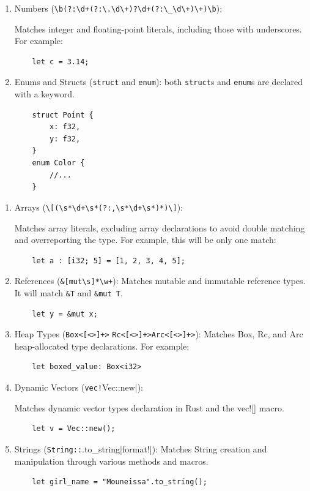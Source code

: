 \documentclass[nomenclature, english, bibtex]{kththesis}
\begin{document}
{\begin{enumerate}
    \item Numbers (\verb|\b(?:\d+(?:\.\d\+)?\d+(?:\_\d\+)\+)\b|): 
    
    Matches integer and floating-point literals, including those with underscores. For example:
    \begin{verbatim}
    let c = 3.14;
    \end{verbatim}
    \item Enums and Structs (\verb|struct| and \verb|enum|): both \texttt{struct}s and \texttt{enum}s are declared with a keyword. 
    \begin{verbatim}
    struct Point {
        x: f32,
        y: f32,
    }
    enum Color {
        //...
    }
    \end{verbatim}
    \end{enumerate}
    \clearpage
    \begin{enumerate}[resume]
    \item Arrays (\verb|\[(\s*\d+\s*(?:,\s*\d+\s*)*)\]|):
    
    Matches array literals, excluding array declarations to avoid double matching and overreporting the type. For example, this will be only one match:
    \begin{verbatim}
    let a : [i32; 5] = [1, 2, 3, 4, 5];  
    \end{verbatim}
    \item References (\verb|&[mut\s]*\w+|): Matches mutable and immutable reference types. It will match \texttt{\&T} and \texttt{\&mut T}.
    \begin{verbatim}
    let y = &mut x;  
    \end{verbatim}
    \item Heap Types (\verb|Box<[<>]+>| \verb|Rc<[<>]+>|\verb|Arc<[<>]+>|): Matches Box, Rc, and Arc heap-allocated type declarations. For example:
    \begin{verbatim}
    let boxed_value: Box<i32>
    \end{verbatim}
    \item Dynamic Vectors (\verb|vec!|Vec::new|): 
    
    Matches dynamic vector types declaration in Rust and the vec![] macro.
    \begin{verbatim}
    let v = Vec::new();
    \end{verbatim}
    \item Strings (\verb|String::|.to\_string|format!|): 
    Matches String creation and manipulation through various methods and macros.
    \begin{verbatim}
    let girl_name = "Mouneissa".to_string();
    \end{verbatim}
\end{enumerate}
 
}
\end{document}
